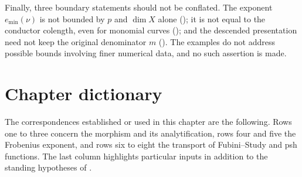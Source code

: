 Finally, three boundary statements should not be conflated.  The exponent
$e_{\min}(\nu)$ is not bounded by $p$ and $\dim X$ alone
(); it is not equal to the conductor
colength, even for monomial curves
(); and the descended presentation need not keep
the original denominator $m$
().  The examples do not address possible
bounds involving finer numerical data, and no such assertion is made.

\section{Chapter dictionary}
\label{sec:ch43-dictionary}

The correspondences established or used in this chapter are the following.
Rows one to three concern the morphism and its analytification, rows four
and five the Frobenius exponent, and rows six to eight the transport of
Fubini--Study and psh functions.  The last column highlights particular
inputs in addition to the standing hypotheses of
.

